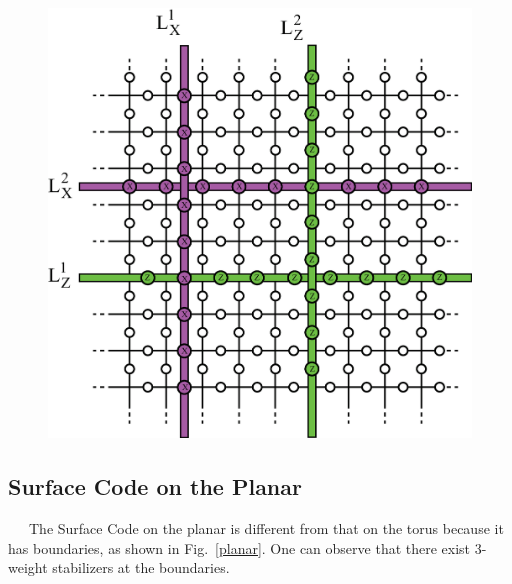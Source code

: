 \documentclass[a4paper,11pt]{ltjsarticle}
\begin{document}
{{    \begin{figure}[h]
        \centering
        \includegraphics[scale=0.40]{figure/logical_operator.eps}
        \vspace{0pt}\caption{}
        \label{logical_operator}
        \vspace{-10pt}
    \end{figure}
    }


    \subsection{Surface Code on the Planar}{
        \ \ \ The Surface Code on the planar is different from that on the torus because it has boundaries, as shown in Fig.~\ref{planar}. One can observe that there exist 3-weight stabilizers at the boundaries. 

}}
\end{document}
